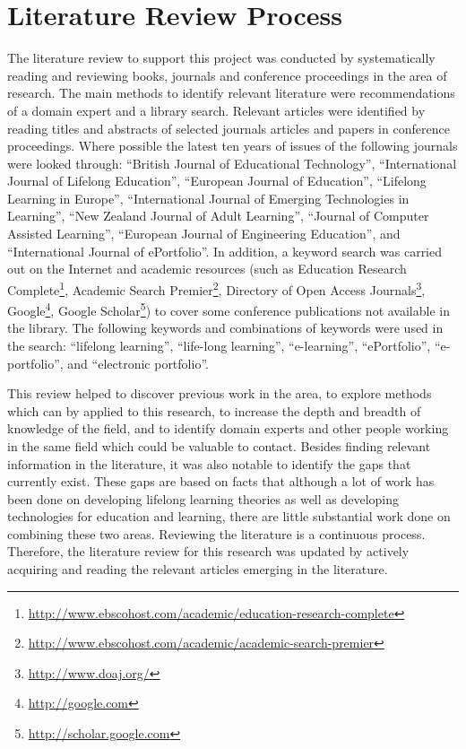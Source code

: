 \section{Literature Review Process}
The literature review to support this project was conducted by systematically
reading and reviewing books, journals and conference proceedings in the area of
research. The main methods to identify relevant literature were recommendations
of a domain expert and a library search. Relevant articles were identified by
reading titles and abstracts of selected journals articles and papers in
conference proceedings. Where possible the latest ten years of issues of the
following journals were looked through: ``British Journal of Educational
Technology'', ``International Journal of Lifelong Education'', ``European
Journal of Education'', ``Lifelong Learning in Europe'', ``International Journal
of Emerging Technologies in Learning'', ``New Zealand Journal of Adult
Learning'', ``Journal of Computer Assisted Learning'', ``European Journal of
Engineering Education'', and ``International Journal of ePortfolio''. In
addition, a keyword search was carried out on the Internet and academic
resources (such as Education Research
Complete\footnote{\url{http://www.ebscohost.com/academic/education-research-complete}},
Academic Search
Premier\footnote{\url{http://www.ebscohost.com/academic/academic-search-premier}},
Directory of Open Access Journals\footnote{\url{http://www.doaj.org/}},
Google\footnote{\url{http://google.com}}, Google
Scholar\footnote{\url{http://scholar.google.com}}) to cover some conference
publications not available in the library. The following keywords and
combinations of keywords were used in the search: ``lifelong learning'',
``life-long learning'', ``e-learning'', ``ePortfolio'', ``e-portfolio'', and
``electronic portfolio''.

This review helped to discover previous work in the area, to explore methods
which can by applied to this research, to increase the depth and breadth of
knowledge of the field, and to identify domain experts and other people working
in the same field which could be valuable to contact. Besides finding relevant
information in the literature, it was also notable to identify the gaps that
currently exist. These gaps are based on facts that although a lot of work has
been done on developing lifelong learning theories as well as developing
technologies for education and learning, there are little substantial work done
on combining these two areas. Reviewing the literature is a continuous process.
Therefore, the literature review for this research was updated by actively
acquiring and reading the relevant articles emerging in the literature.

